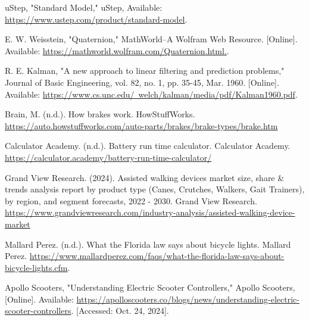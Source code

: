 \begin{thebibliography}{45}
	 uStep, "Standard Model," uStep, Available: \href{https://www.ustep.com/product/standard-model}{https://www.ustep.com/product/standard-model}.
	
	 E. W. Weisstein, "Quaternion," MathWorld--A Wolfram Web Resource. [Online]. Available: \href{https://mathworld.wolfram.com/Quaternion.html.}{https://mathworld.wolfram.com/Quaternion.html.}.
	
	 R. E. Kalman, "A new approach to linear filtering and prediction problems," Journal of Basic Engineering, vol. 82, no. 1, pp. 35-45, Mar. 1960. [Online]. Available: \href{https://www.cs.unc.edu/~welch/kalman/media/pdf/Kalman1960.pdf}{https://www.cs.unc.edu/~welch/kalman/media/pdf/Kalman1960.pdf}.
	
	 Brain, M. (n.d.). How brakes work. HowStuffWorks. \href{https://auto.howstuffworks.com/auto-parts/brakes/brake-types/brake.htm}{https://auto.howstuffworks.com/auto-parts/brakes/brake-types/brake.htm}
	
	 Calculator Academy. (n.d.). Battery run time calculator. Calculator Academy. \href{https://calculator.academy/battery-run-time-calculator/}{https://calculator.academy/battery-run-time-calculator/}
	
	 Grand View Research. (2024). Assisted walking devices market size, share \& trends analysis report by product type (Canes, Crutches, Walkers, Gait Trainers), by region, and segment forecasts, 2022 - 2030. Grand View Research. \href{https://www.grandviewresearch.com/industry-analysis/assisted-walking-device-market}{https://www.grandviewresearch.com/industry-analysis/assisted-walking-device-market}
	
	 Mallard Perez. (n.d.). What the Florida law says about bicycle lights. Mallard Perez. \href{https://www.mallardperez.com/faqs/what-the-florida-law-says-about-bicycle-lights.cfm}{https://www.mallardperez.com/faqs/what-the-florida-law-says-about-bicycle-lights.cfm}.
	
	 Apollo Scooters, "Understanding Electric Scooter Controllers," Apollo Scooters, [Online]. Available: \href{https://apolloscooters.co/blogs/news/understanding-electric-scooter-controllers?srsltid=AfmBOoqWTbV4qa2VxA8NxpdquVzQMn4LeQYiwBG756xhscX0vExgNW-8}{https://apolloscooters.co/blogs/news/understanding-electric-scooter-controllers}. [Accessed: Oct. 24, 2024].
	

\end{thebibliography}
